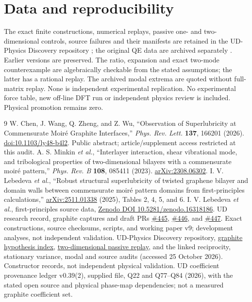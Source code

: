 \documentclass[9pt,a4paper,twocolumn]{extarticle}
\begin{document}
\section*{Data and reproducibility}
The exact finite constructions, numerical replays, passive one- and two-dimensional controls, source failures and their manifests are retained in the UD-Physics Discovery repository \cite{udphysics}; the original QE data are archived separately \cite{zenodo}. Earlier versions are preserved. The ratio, expansion and exact two-mode counterexample are algebraically checkable from the stated assumptions; the latter has a rational replay. The archived modal extrema are quoted without full-matrix replay. None is independent experimental replication. No experimental force table, new off-line DFT run or independent physics review is included. Physical promotion remains zero.

\begin{thebibliography}{9}\setlength{\itemsep}{0pt}
 W. Chen, J. Wang, Q. Zheng, and Z. Wu, ``Observation of Superlubricity at Commensurate Moir\'e Graphite Interfaces,'' \emph{Phys. Rev. Lett.} \textbf{137}, 166201 (2026). \href{https://doi.org/10.1103/ly48-b4l2}{doi:10.1103/ly48-b4l2}. Public abstract; article/supplement access restricted at this audit.
 A. S. Minkin \emph{et al.}, ``Interlayer interaction, shear vibrational mode, and tribological properties of two-dimensional bilayers with a commensurate moir\'e pattern,'' \emph{Phys. Rev. B} \textbf{108}, 085411 (2023). \href{https://arxiv.org/abs/2308.06302}{arXiv:2308.06302}.
 I. V. Lebedeva \emph{et al.}, ``Robust structural superlubricity of twisted graphene bilayer and domain walls between commensurate moir\'e pattern domains from first-principles calculations,'' \href{https://arxiv.org/abs/2511.01338}{arXiv:2511.01338} (2025), Tables 2, 4, 5, and 6.
 I. V. Lebedeva \emph{et al.}, first-principles source data, \href{https://doi.org/10.5281/zenodo.16318186}{Zenodo DOI 10.5281/zenodo.16318186}.
 UD research record, graphite captures and draft PRs \href{https://github.com/ud-tetra/UD/pull/445}{\#445}, \href{https://github.com/ud-tetra/UD/pull/446}{\#446}, and \href{https://github.com/ud-tetra/UD/pull/447}{\#447}. Exact constructions, source checksums, scripts, and working paper v9; development analyses, not independent validation.
 UD-Physics Discovery repository, \href{https://github.com/ud-tetra/UD-Physics/tree/main/experiments/graphite-superlubricity}{graphite hypothesis index}, \href{https://github.com/ud-tetra/UD-Physics/tree/main/experiments/graphite-2d-relaxation}{two-dimensional passive replay}, and the linked reciprocity, stationary variance, modal and source audits (accessed 25 October 2026). Constructor records, not independent physical validation.
 UD coefficient provenance ledger v0.39(2), supplied file, Q22 and Q77--Q84 (2026), with the stated open source and physical phase-map dependencies; not a measured graphite coefficient set.
\end{thebibliography}
\end{document}
